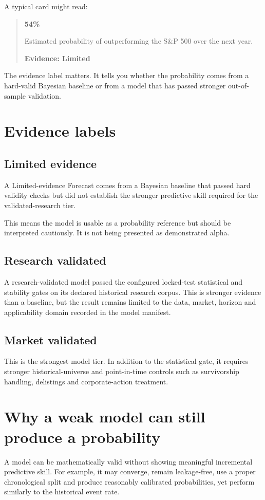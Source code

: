 \documentclass[11pt]{article}
\begin{document}
A typical card might read:
\begin{quote}
\textbf{54\%}\par
Estimated probability of outperforming the S\&P 500 over the next year.\par
\textbf{Evidence: Limited}
\end{quote}

The evidence label matters. It tells you whether the probability comes from a hard-valid Bayesian baseline or from a model that has passed stronger out-of-sample validation.

\section{Evidence labels}
\subsection{Limited evidence}
A Limited-evidence Forecast comes from a Bayesian baseline that passed hard validity checks but did not establish the stronger predictive skill required for the validated-research tier.

This means the model is usable as a probability reference but should be interpreted cautiously. It is not being presented as demonstrated alpha.

\subsection{Research validated}
A research-validated model passed the configured locked-test statistical and stability gates on its declared historical research corpus. This is stronger evidence than a baseline, but the result remains limited to the data, market, horizon and applicability domain recorded in the model manifest.

\subsection{Market validated}
This is the strongest model tier. In addition to the statistical gate, it requires stronger historical-universe and point-in-time controls such as survivorship handling, delistings and corporate-action treatment.

\section{Why a weak model can still produce a probability}
A model can be mathematically valid without showing meaningful incremental predictive skill. For example, it may converge, remain leakage-free, use a proper chronological split and produce reasonably calibrated probabilities, yet perform similarly to the historical event rate.
\end{document}
